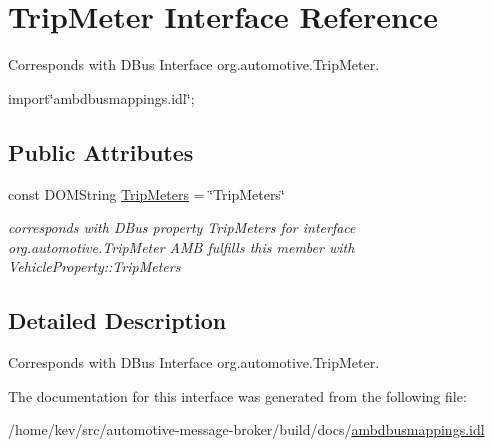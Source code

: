\hypertarget{interfaceTripMeter}{\section{Trip\+Meter Interface Reference}
\label{interfaceTripMeter}
}


Corresponds with D\+Bus Interface org.\+automotive.\+Trip\+Meter.  




{\ttfamily import\char`\"{}ambdbusmappings.\+idl\char`\"{};}

\subsection*{Public Attributes}
\begin{DoxyCompactItemize}
\item 
\hypertarget{interfaceTripMeter_a0f8ccb9b8abcc132dc98b1d14ad681a3}{const D\+O\+M\+String \hyperlink{interfaceTripMeter_a0f8ccb9b8abcc132dc98b1d14ad681a3}{Trip\+Meters} = \char`\"{}Trip\+Meters\char`\"{}}\label{interfaceTripMeter_a0f8ccb9b8abcc132dc98b1d14ad681a3}

\begin{DoxyCompactList}\small\item\em corresponds with D\+Bus property Trip\+Meters for interface org.\+automotive.\+Trip\+Meter A\+M\+B fulfills this member with Vehicle\+Property\+::\+Trip\+Meters \end{DoxyCompactList}\end{DoxyCompactItemize}


\subsection{Detailed Description}
Corresponds with D\+Bus Interface org.\+automotive.\+Trip\+Meter. 

The documentation for this interface was generated from the following file\+:\begin{DoxyCompactItemize}
\item 
/home/kev/src/automotive-\/message-\/broker/build/docs/\hyperlink{ambdbusmappings_8idl}{ambdbusmappings.\+idl}\end{DoxyCompactItemize}
